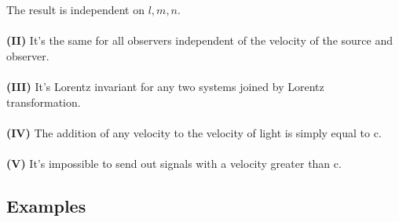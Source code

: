 The result is independent on $l,m,n$.
\\\\\textbf{(II)} It's the same for all observers independent of the velocity of the source and observer.
\\\\\textbf{(III)} It's Lorentz invariant for any two systems joined by Lorentz transformation.
\\\\\textbf{(IV)} The addition of any velocity to the velocity of light is simply equal to c.
\\\\\textbf{(V)} It's impossible to send out signals with a velocity greater than c.

\newpage

\subsection{Examples}

